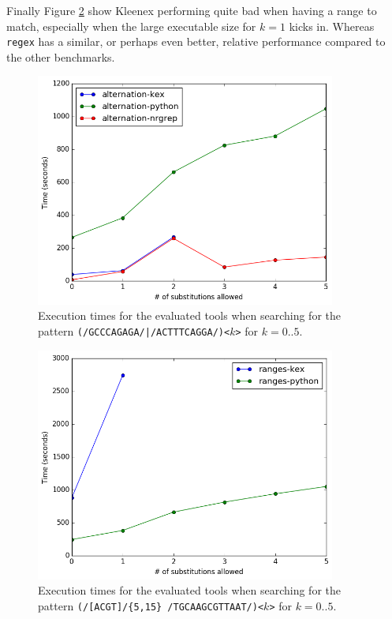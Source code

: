 Finally Figure \ref{fig:ranges} show Kleenex performing quite bad when having a
range to match, especially when the large executable size for $k=1$ kicks in.
Whereas \texttt{regex} has a similar, or perhaps even better, relative
performance compared to the other benchmarks.

\begin{figure}[H]
  \centering
  \includegraphics[width=0.88\textwidth]{images/alternation.png}
  \caption{Execution times for the evaluated tools when searching for the
    pattern \texttt{(/GCCCAGAGA/|/ACTTTCAGGA/)<$k$>} for $k=0..5$.}
  \label{fig:alternation}
\end{figure}

\begin{figure}[H]
  \centering
  \includegraphics[width=0.88\textwidth]{images/ranges.png}
  \caption{Execution times for the evaluated tools when searching for the
    pattern \texttt{(/[ACGT]/\{5,15\} /TGCAAGCGTTAAT/)<$k$>} for $k=0..5$.}
  \label{fig:ranges}
\end{figure}

